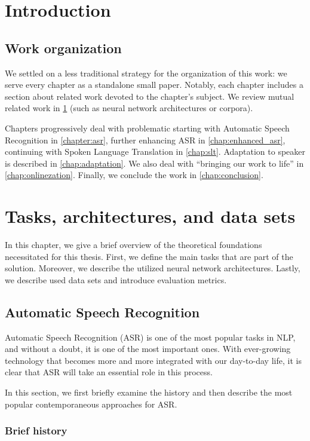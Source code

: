 
\chapter*{Introduction}

\section*{Work organization}
We settled on a less traditional strategy for the organization of this work: we serve every chapter as a standalone small paper. Notably, each chapter includes a section about related work devoted to the chapter's subject. We review mutual related work in \cref{chap:theory} (such as neural network architectures or corpora).

Chapters progressively deal with problematic starting with Automatic Speech Recognition in \cref{chapter:asr}, further enhancing ASR in \cref{chap:enhanced_asr}, continuing with Spoken Language Translation in \cref{chap:slt}. Adaptation to speaker is described in \cref{chap:adaptation}. We also deal with ``bringing our work to life'' in \cref{chap:onlinezation}. Finally, we conclude the work in \cref{chap:conclusion}.


\chapter{Tasks, architectures, and data sets}
\label{chap:theory}
In this chapter, we give a brief overview of the theoretical foundations necessitated for this thesis. First, we define the main tasks that are part of the solution. Moreover, we describe the utilized neural network architectures. Lastly, we describe used data sets and introduce evaluation metrics.

\section{Automatic Speech Recognition}

Automatic Speech Recognition (ASR) is one of the most popular tasks in NLP, and without a doubt, it is one of the most important ones. With ever-growing technology that becomes more and more integrated with our day-to-day life, it is clear that ASR will take an essential role in this process.

In this section, we first briefly examine the history and then describe the most popular contemporaneous approaches for ASR.

\subsection{Brief history}

